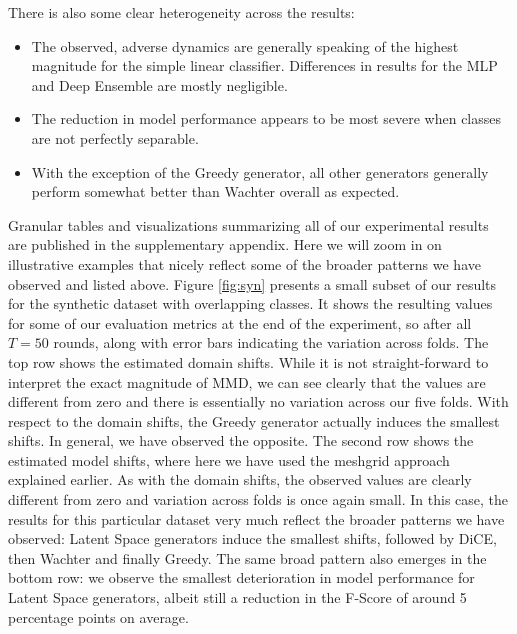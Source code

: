 \documentclass[conference,final,]{IEEEtran}
\providecommand{\tightlist}{%
  \setlength{\itemsep}{0pt}\setlength{\parskip}{0pt}}
\begin{document}
There is also some clear heterogeneity across the results:

\begin{itemize}
\tightlist
\item
  The observed, adverse dynamics are generally speaking of the highest magnitude for the simple linear classifier. Differences in results for the MLP and Deep Ensemble are mostly negligible.
\item
  The reduction in model performance appears to be most severe when classes are not perfectly separable.
\item
  With the exception of the Greedy generator, all other generators generally perform somewhat better than Wachter overall as expected.
\end{itemize}

Granular tables and visualizations summarizing all of our experimental results are published in the supplementary appendix. Here we will zoom in on illustrative examples that nicely reflect some of the broader patterns we have observed and listed above. Figure \ref{fig:syn} presents a small subset of our results for the synthetic dataset with overlapping classes. It shows the resulting values for some of our evaluation metrics at the end of the experiment, so after all \(T=50\) rounds, along with error bars indicating the variation across folds. The top row shows the estimated domain shifts. While it is not straight-forward to interpret the exact magnitude of MMD, we can see clearly that the values are different from zero and there is essentially no variation across our five folds. With respect to the domain shifts, the Greedy generator actually induces the smallest shifts. In general, we have observed the opposite. The second row shows the estimated model shifts, where here we have used the meshgrid approach explained earlier. As with the domain shifts, the observed values are clearly different from zero and variation across folds is once again small. In this case, the results for this particular dataset very much reflect the broader patterns we have observed: Latent Space generators induce the smallest shifts, followed by DiCE, then Wachter and finally Greedy. The same broad pattern also emerges in the bottom row: we observe the smallest deterioration in model performance for Latent Space generators, albeit still a reduction in the F-Score of around 5 percentage points on average.
\end{document}
